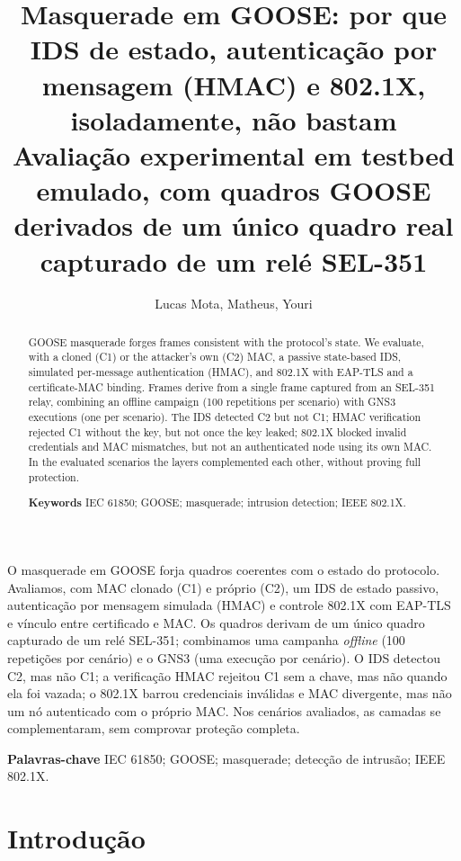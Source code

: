 \documentclass[12pt]{article}
\title{Masquerade em GOOSE: por que IDS de estado, autenticação por mensagem (HMAC) e 802.1X, isoladamente, não bastam\\[6pt]{\large\mdseries Avaliação experimental em testbed emulado, com quadros GOOSE derivados de um único quadro real capturado de um relé SEL-351}}
\author{Lucas Mota\inst{1}, Matheus\inst{1}, Youri\inst{1}}
\begin{document}
\maketitle

\begin{abstract}
GOOSE masquerade forges frames consistent with the protocol's state. We evaluate, with a cloned (C1) or the attacker's own (C2) MAC, a passive state-based IDS, simulated per-message authentication (HMAC), and 802.1X with EAP-TLS and a certificate-MAC binding. Frames derive from a single frame captured from an SEL-351 relay, combining an offline campaign (100 repetitions per scenario) with GNS3 executions (one per scenario). The IDS detected C2 but not C1; HMAC verification rejected C1 without the key, but not once the key leaked; 802.1X blocked invalid credentials and MAC mismatches, but not an authenticated node using its own MAC. In the evaluated scenarios the layers complemented each other, without proving full protection.

\noindent\textbf{Keywords} IEC 61850; GOOSE; masquerade; intrusion detection; IEEE 802.1X.
\end{abstract}

\begin{resumo}
O masquerade em GOOSE forja quadros coerentes com o estado do protocolo. Avaliamos, com MAC clonado (C1) e próprio (C2), um IDS de estado passivo, autenticação por mensagem simulada (HMAC) e controle 802.1X com EAP-TLS e vínculo entre certificado e MAC. Os quadros derivam de um único quadro capturado de um relé SEL-351; combinamos uma campanha \emph{offline} (100 repetições por cenário) e o GNS3 (uma execução por cenário). O IDS detectou C2, mas não C1; a verificação HMAC rejeitou C1 sem a chave, mas não quando ela foi vazada; o 802.1X barrou credenciais inválidas e MAC divergente, mas não um nó autenticado com o próprio MAC. Nos cenários avaliados, as camadas se complementaram, sem comprovar proteção completa.

\noindent\textbf{Palavras-chave} IEC 61850; GOOSE; masquerade; detecção de intrusão; IEEE 802.1X.
\end{resumo}

\section{Introdução}\label{sec:1}
\end{document}
